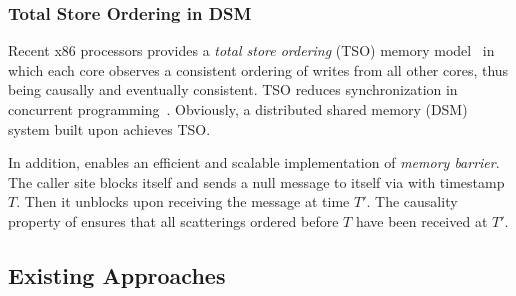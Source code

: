 \subsubsection{Total Store Ordering in DSM}

Recent x86 processors provides a \textit{total store ordering} (TSO) memory model~\cite{sewell2010x86} in which each core observes a consistent ordering of writes from all other cores, thus being causally and eventually consistent.
TSO reduces synchronization in concurrent programming~\cite{morrison2013fast,tassarotti2015verifying}.
Obviously, a distributed shared memory (DSM) system built upon \sys achieves TSO.

In addition, \sys enables an efficient and scalable implementation of \textit{memory barrier}.
The caller site blocks itself and sends a null message to itself via \sys with timestamp $T$. Then it unblocks upon receiving the message at time $T'$.
The causality property of \sys ensures that all scatterings ordered before $T$ have been received at $T'$.

\subsection{Existing Approaches}
\label{subsec:existing-approaches}


